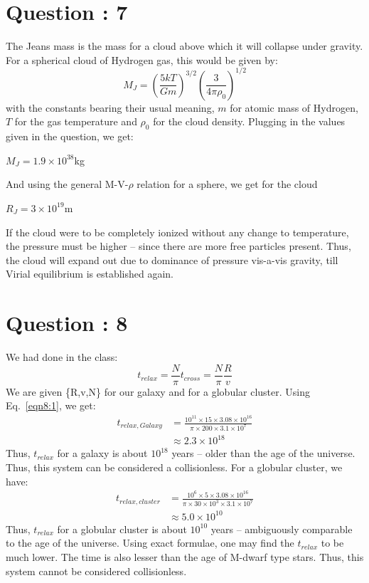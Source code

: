 \documentclass{article}
\begin{document}
\section{Question : 7}
The Jeans mass is the mass for a cloud above which it will collapse under gravity. For a spherical cloud of Hydrogen gas, this would be given by:
\begin{equation}
M_J = \left(\frac{5kT}{Gm}\right)^{3/2}\left(\frac{3}{4\pi \rho_0}\right)^{1/2}
\end{equation}
with the constants bearing their usual meaning, $m$ for atomic mass of Hydrogen, $T$ for the gas temperature and $\rho_0$ for the cloud density. Plugging in the values given in the question, we get:
\begin{center}
$M_J = 1.9\times10^{38}$kg
\end{center}
And using the general M-V-$\rho$ relation for a sphere, we get for the cloud 
\begin{center}
$R_J = 3\times10^{19}$m
\end{center}
If the cloud were to be completely ionized without any change to temperature, the pressure must be higher -- since there are more free particles present. Thus, the cloud will expand out due to dominance of pressure vis-a-vis gravity, till Virial equilibrium is established again.
\section{Question : 8}
We had done in the class:
\begin{equation}
t_{relax} = \frac{N}{\pi}t_{cross} = \frac{N}{\pi}\frac{R}{v}
\label{eqn8:1}
\end{equation}
We are given \{R,v,N\} for our galaxy and for a globular cluster. Using Eq.~\ref{eqn8:1}, we get:
\begin{equation}
\begin{split}
t_{relax,Galaxy} &= \frac{10^{11}\times 15\times 3.08 \times 10^{16}}{\pi \times 200\times 3.1\times 10^7} \\
&\approx 2.3\times 10^{18}
\end{split}
\end{equation}
Thus, $t_{relax}$ for a galaxy is about $10^{18}$ years -- older than the age of the universe. Thus, this system can be considered a collisionless.
For a globular cluster, we have:
\begin{equation}
\begin{split}
t_{relax,cluster} &=\frac{10^6\times 5\times 3.08 \times 10^{16}}{\pi \times 30\times 10^3\times 3.1\times 10^7}\\
&\approx 5.0\times 10^{10}
\end{split}
\end{equation}
Thus, $t_{relax}$ for a globular cluster is about $10^{10}$ years -- ambiguously comparable to the age of the universe. Using exact formulae, one may find the $t_{relax}$ to be much lower. The time is also lesser than the age of M-dwarf type stars. Thus, this system cannot be considered collisionless.
\end{document}
